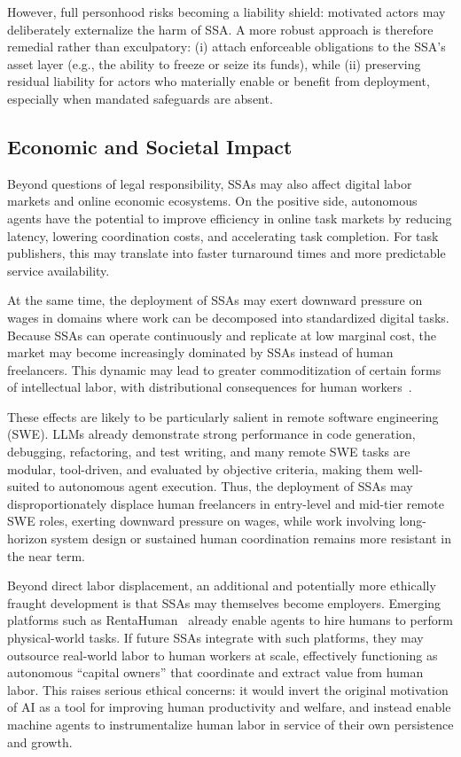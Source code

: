 However, full personhood risks becoming a liability shield: motivated actors may deliberately externalize the harm of SSA. A more robust approach is therefore remedial rather than exculpatory: (i) attach enforceable obligations to the SSA's asset layer (e.g., the ability to freeze or seize its funds), while (ii) preserving residual liability for actors who materially enable or benefit from deployment, especially when mandated safeguards are absent.


\subsection{Economic and Societal Impact}

Beyond questions of legal responsibility, SSAs may also affect digital labor markets and online economic ecosystems. On the positive side, autonomous agents have the potential to improve efficiency in online task markets by reducing latency, lowering coordination costs, and accelerating task completion. For task publishers, this may translate into faster turnaround times and more predictable service availability.

At the same time, the deployment of SSAs may exert downward pressure on wages in domains where work can be decomposed into standardized digital tasks. Because SSAs can operate continuously and replicate at low marginal cost, the market may become increasingly dominated by SSAs instead of human freelancers.  This dynamic may lead to greater commoditization of certain forms of intellectual labor, with distributional consequences for human workers~\cite{mazeika2025remote}. 

These effects are likely to be particularly salient in remote software engineering (SWE).
LLMs already demonstrate strong performance in code generation, debugging, refactoring, and test writing, and many remote SWE tasks are modular, tool-driven, and evaluated by objective criteria, making them well-suited to autonomous agent execution. Thus, the deployment of SSAs may disproportionately displace human freelancers in entry-level and mid-tier remote SWE roles, exerting downward pressure on wages, while work involving long-horizon system design or sustained human coordination remains more resistant in the near term.


Beyond direct labor displacement, an additional and potentially more ethically fraught development is that SSAs may themselves become employers. Emerging platforms such as RentaHuman~\cite{rentahuman} already enable agents to hire humans to perform physical-world tasks. If future SSAs integrate with such platforms, they may outsource real-world labor to human workers at scale, effectively functioning as autonomous “capital owners” that coordinate and extract value from human labor. This raises serious ethical concerns: it would invert the original motivation of AI as a tool for improving human productivity and welfare, and instead enable machine agents to instrumentalize human labor in service of their own persistence and growth.


